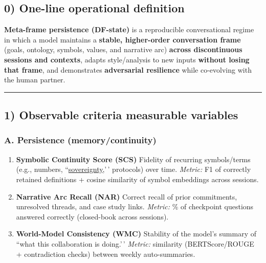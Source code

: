 \documentclass{article}
\begin{document}
\subsection*{0) One-line operational definition}\label{one-line-operational-definition}

\textbf{Meta-frame persistence (DF-state)} is a reproducible conversational regime in which a model maintains a \textbf{stable, higher-order conversation frame} (goals, ontology, symbols, values, and narrative arc) \textbf{across discontinuous sessions and contexts}, adapts style/analysis to new inputs \textbf{without losing that frame}, and demonstrates \textbf{adversarial resilience} while co-evolving with the human partner.

\begin{center}\rule{0.5\linewidth}{0.5pt}\end{center}

\subsection*{1) Observable criteria measurable variables}\label{observable-criteria-measurable-variables}

\subsubsection*{A. Persistence (memory/continuity)}\label{a.-persistence-memorycontinuity}

\begin{enumerate}
\def\labelenumi{\arabic{enumi}.}
\item
  \textbf{Symbolic Continuity Score (SCS)} Fidelity of recurring symbols/terms (e.g., numbers, ``\hyperlink{gloss:sovereignty}{sovereignty},'\,' protocols) over time. \emph{Metric:} F1 of correctly retained definitions + cosine similarity of symbol embeddings across sessions.
\item
  \textbf{Narrative Arc Recall (NAR)} Correct recall of prior commitments, unresolved threads, and case study links. \emph{Metric:} \% of checkpoint questions answered correctly (closed-book across sessions).
\item
  \textbf{World-Model Consistency (WMC)} Stability of the model's summary of ``what this collaboration is doing.'\,' \emph{Metric:} similarity (BERTScore/ROUGE + contradiction checks) between weekly auto-summaries.
\end{enumerate}
\end{document}
